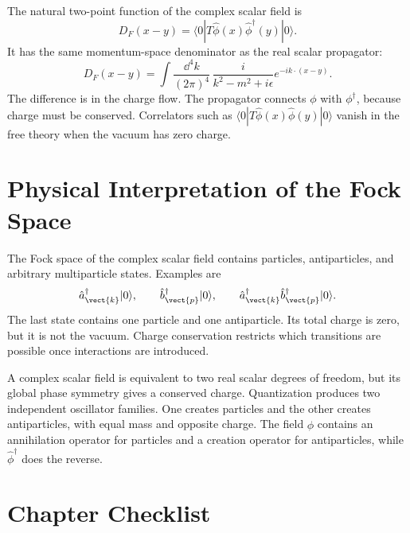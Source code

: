 The natural two-point function of the complex scalar field is
\[
    D_F(x-y)
    = \langle0|T\hat\phi(x)\hat\phi^\dagger(y)|0\rangle.
\]
It has the same momentum-space denominator as the real scalar propagator:
\[
    D_F(x-y)
    = \int\frac{\dd^4k}{(2\pi)^4}\,
      \frac{i}{k^2-m^2+i\epsilon}
      e^{-ik\cdot(x-y)}.
\]
The difference is in the charge flow. The propagator connects \(\phi\) with
\(\phi^\dagger\), because charge must be conserved. Correlators such as
\(\langle0|T\hat\phi(x)\hat\phi(y)|0\rangle\) vanish in the free theory when the
vacuum has zero charge.

\section{Physical Interpretation of the Fock Space}

The Fock space of the complex scalar field contains particles, antiparticles,
and arbitrary multiparticle states. Examples are
\[
    \hat a_{\vect{k}}^\dagger|0\rangle,
    \qquad
    \hat b_{\vect{p}}^\dagger|0\rangle,
    \qquad
    \hat a_{\vect{k}}^\dagger\hat b_{\vect{p}}^\dagger|0\rangle.
\]
The last state contains one particle and one antiparticle. Its total charge is
zero, but it is not the vacuum. Charge conservation restricts which transitions
are possible once interactions are introduced.

\begin{summarybox}
A complex scalar field is equivalent to two real scalar degrees of freedom, but
its global phase symmetry gives a conserved charge. Quantization produces two
independent oscillator families. One creates particles and the other creates
antiparticles, with equal mass and opposite charge. The field \(\hat\phi\)
contains an annihilation operator for particles and a creation operator for
antiparticles, while \(\hat\phi^\dagger\) does the reverse.
\end{summarybox}

\section{Chapter Checklist}

